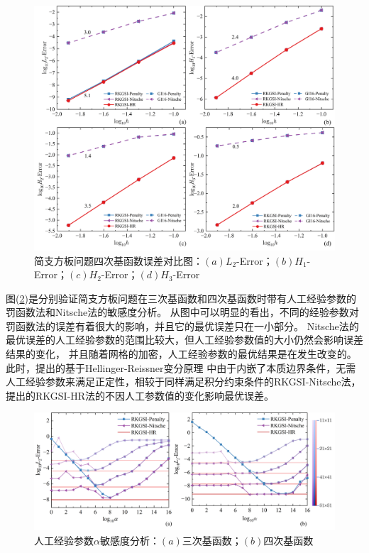 \begin{figure}
    \centering
    \includegraphics[scale=0.6]{figure/P/R/QLH.png}
    \caption{简支方板问题四次基函数误差对比图：$(a)L_2$-Error；$(b)H_1$-Error；$(c)H_2$-Error；$(d)H_3$-Error}\label{RQLH}
\end{figure}\newpage
图(\ref{Ralpha})是分别验证简支方板问题在三次基函数和四次基函数时带有人工经验参数的罚函数法和Nitsche法的敏感度分析。
从图中可以明显的看出，不同的经验参数对罚函数法的误差有着很大的影响，并且它的最优误差只在一小部分。
Nitsche法的最优误差的人工经验参数的范围比较大，但人工经验参数值的大小仍然会影响误差结果的变化，
并且随着网格的加密，人工经验参数的最优结果是在发生改变的。此时，提出的基于Hellinger-Reissner变分原理
中由于内嵌了本质边界条件，无需人工经验参数来满足正定性，相较于同样满足积分约束条件的RKGSI-Nitsche法，提出的RKGSI-HR法的不因人工参数值的变化影响最优误差。\par
\begin{figure}[!h]
    \centering
    \includegraphics[scale=0.6]{figure/P/R/Ralpha.png}
    \caption{人工经验参数$\alpha$敏感度分析：$(a)$三次基函数；$(b)$四次基函数}\label{Ralpha}
\end{figure}
